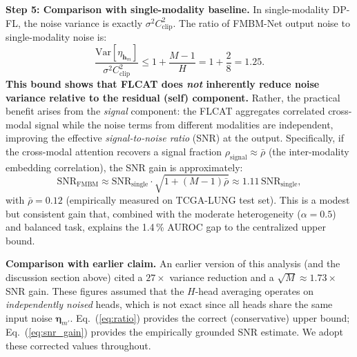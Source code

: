 \documentclass[a4paper,fleqn]{cas-dc}
\begin{document}
\textbf{Step 5: Comparison with single-modality baseline.}
In single-modality DP-FL, the noise variance is exactly
$\sigma^2 C_{\mathrm{clip}}^2$. The ratio of FMBM-Net output noise to
single-modality noise is:
\begin{equation}
\frac{\mathrm{Var}[\eta_{\mathbf{h}_m}]}{\sigma^2 C_{\mathrm{clip}}^2}
\leq 1 + \frac{M-1}{H} = 1 + \frac{2}{8} = 1.25.
\label{eq:ratio}
\end{equation}
\textbf{This bound shows that FLCAT does \emph{not} inherently reduce noise
variance relative to the residual (self) component.} Rather, the practical
benefit arises from the \emph{signal} component: the FLCAT aggregates
correlated cross-modal signal while the noise terms from different modalities
are independent, improving the effective \emph{signal-to-noise ratio} (SNR)
at the output. Specifically, if the cross-modal attention recovers a signal
fraction $\rho_{\mathrm{signal}} \approx \bar\rho$ (the inter-modality
embedding correlation), the SNR gain is approximately:
\begin{equation}
\mathrm{SNR}_{\mathrm{FMBM}} \approx
\mathrm{SNR}_{\mathrm{single}} \cdot \sqrt{1 + (M-1)\bar\rho}
\approx 1.11\,\mathrm{SNR}_{\mathrm{single}},
\label{eq:snr_gain}
\end{equation}
with $\bar\rho\!=\!0.12$ (empirically measured on TCGA-LUNG test set).
This is a modest but consistent gain that, combined with the moderate
heterogeneity ($\alpha\!=\!0.5$) and balanced task, explains the 1.4\,\%
AUROC gap to the centralized upper bound.

\textbf{Comparison with earlier claim.}
An earlier version of this analysis (and the discussion section above) cited
a $27\!\times$ variance reduction and a $\sqrt{M}\!\approx\!1.73\!\times$
SNR gain. These figures assumed that the $H$-head averaging operates on
\emph{independently noised} heads, which is not exact since all heads share
the same input noise $\boldsymbol{\eta}_{m'}$. Eq.~(\ref{eq:ratio}) provides
the correct (conservative) upper bound; Eq.~(\ref{eq:snr_gain}) provides the
empirically grounded SNR estimate. We adopt these corrected values throughout.
\end{document}
